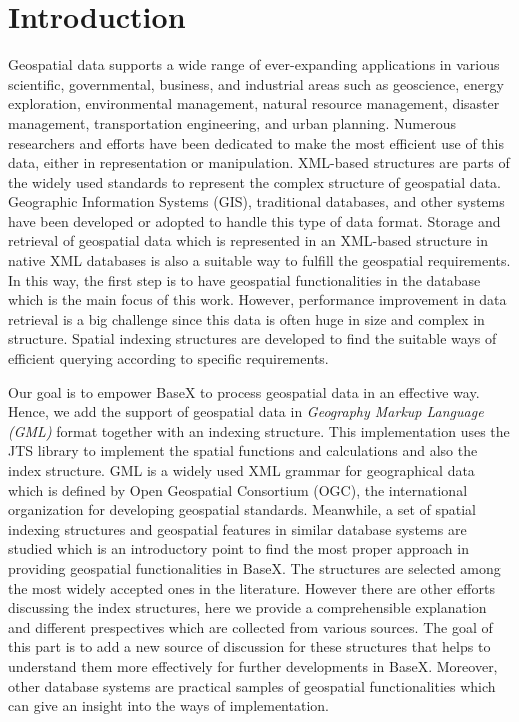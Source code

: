 \documentclass[a4paper,12pt]{article}
\begin{document}
\section{Introduction}
\setcounter{page}{1}
Geospatial data supports a wide range of ever-expanding applications in various scientific, governmental, business, and industrial areas such as geoscience, energy exploration, environmental management, natural resource management, disaster management, transportation engineering, and urban planning. 
Numerous researchers and efforts have been dedicated to make the most efficient use of this data, either in representation or manipulation. 
XML-based structures are parts of the widely used standards to represent the complex structure of geospatial data. 
Geographic Information Systems (GIS), traditional databases, and other systems have been developed or adopted to handle this type of data format. 
Storage and retrieval of geospatial data which is represented in an XML-based structure in native XML databases is also a suitable way to fulfill the geospatial requirements. 
In this way, the first step is to have geospatial functionalities in the database which is the main focus of this work.
However, performance improvement in data retrieval is a big challenge since this data is often huge in size and complex in structure. 
Spatial indexing structures are developed to find the suitable ways of efficient querying according to specific requirements. 

Our goal is to empower BaseX to process geospatial data in an effective way. 
Hence, we add the support of geospatial data in \emph{Geography Markup Language (GML)} format together with an indexing structure. This implementation uses the JTS library to implement the spatial functions and calculations and also the index structure.
GML is a widely used XML grammar for geographical data which is defined by Open Geospatial Consortium (OGC), the international organization for developing geospatial standards.
Meanwhile, a set of spatial indexing structures and geospatial features in similar database systems are studied which is an introductory point 
to find the most proper approach in providing geospatial functionalities in BaseX. The structures are selected among the most widely accepted ones in the literature. However there are other efforts discussing the index structures, here we provide a comprehensible explanation and different prespectives which are collected from various sources. The goal of this part is to add a new source of discussion for these structures that helps to understand them more effectively for further developments in BaseX. Moreover, other database systems are practical samples of geospatial functionalities which can give an insight into the ways of implementation.
\end{document}
